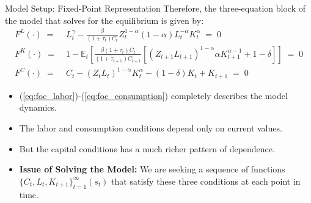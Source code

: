 \documentclass[10pt,c,aspectratio=1610,handout]{beamer}
\begin{document}
\begin{frame}{Model Setup: Fixed-Point Representation}%
  Therefore, the three-equation block of the model that solves for the equilibrium is given by:%
  \begin{align}%
    F^L(\cdot) \; = & \; L_t^{\gamma} - \frac{\beta}{\left(1+\tau_t\right) C_t} Z_t^{1-\alpha} \left(1-\alpha\right) L_t^{-\alpha} K_t^{\alpha} \; = \; 0\label{eq:foc_labor}\\%
    F^K(\cdot) \; = & \; 1 - \mathbb{E}_t \left[ \frac{\beta\left(1+\tau_t\right)C_t}{\left(1+\tau_{t+1}\right)C_{t+1}} \left[ \left(Z_{t+1}L_{t+1}\right)^{1-\alpha} \alpha K_{t+1}^{\alpha-1} + 1 - \delta \right] \right] \; = \; 0\\%
    F^C(\cdot) \; = & \; C_t - \left(Z_t L_t\right)^{1-\alpha} K_t^\alpha - (1-\delta) K_t + K_{t+1} \; = \; 0\label{eq:foc_consumption}%
  \end{align}%
  \begin{itemize}%
    \item[$\blacktriangleright$] (\ref{eq:foc_labor})-(\ref{eq:foc_consumption}) completely describes the model dynamics.%
    \item[$\blacktriangleright$] The labor and consumption conditions depend only on current values.%
    \item[$\blacktriangleright$] But the capital conditions has a much richer pattern of dependence.%
    \pause%
    \item[$\Rightarrow$] \textbf{Issue of Solving the Model:} We are seeking a sequence of functions $\{ C_t, L_t, K_{t+1} \}_{t=1}^{\infty}(s_t)$ that satisfy these three conditions at each point in time.%
  \end{itemize}%
\end{frame}%
\end{document}
